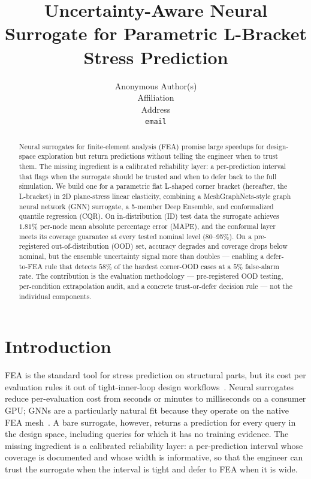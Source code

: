 \documentclass{article}
\title{Uncertainty-Aware Neural Surrogate for Parametric L-Bracket Stress Prediction}
\author{Anonymous Author(s)\\
Affiliation\\
Address\\
\texttt{email}\\
}
\begin{document}
\maketitle

\begin{abstract}
Neural surrogates for finite-element analysis (FEA) promise large
speedups for design-space exploration but return predictions without
telling the engineer when to trust them. The missing ingredient is a
calibrated reliability layer: a per-prediction interval that flags when
the surrogate should be trusted and when to defer back to the full
simulation. We build one for a parametric flat L-shaped corner bracket
(hereafter, the L-bracket) in 2D plane-stress linear elasticity,
combining a MeshGraphNets-style graph neural network (GNN) surrogate, a
5-member Deep Ensemble, and conformalized quantile regression (CQR). On
in-distribution (ID) test data the surrogate achieves $1.81\%$ per-node
mean absolute percentage error (MAPE), and the conformal layer meets
its coverage guarantee at every tested nominal level (80--95\%). On a
pre-registered out-of-distribution (OOD) set, accuracy degrades and
coverage drops below nominal, but the ensemble uncertainty signal more
than doubles --- enabling a defer-to-FEA rule that detects $58\%$ of
the hardest corner-OOD cases at a $5\%$ false-alarm rate. The
contribution is the evaluation methodology --- pre-registered OOD
testing, per-condition extrapolation audit, and a concrete
trust-or-defer decision rule --- not the individual components.
\end{abstract}

\section{Introduction}
\label{sec:intro}

FEA is the standard tool for stress prediction on structural parts, but
its cost per evaluation rules it out of tight-inner-loop design
workflows~\citep{maurizi2022gnn, pfaff2021meshgraphnets}. Neural
surrogates reduce per-evaluation cost from seconds or minutes to
milliseconds on a consumer GPU; GNNs are a particularly natural fit
because they operate on the native FEA mesh~\citep{pfaff2021meshgraphnets,
maurizi2022gnn, gladstone2024gnn}. A bare surrogate, however, returns a
prediction for every query in the design space, including queries for
which it has no training evidence. The missing ingredient is a
calibrated reliability layer: a per-prediction interval whose coverage
is documented and whose width is informative, so that the engineer can
trust the surrogate when the interval is tight and defer to FEA when it
is wide.
\end{document}
